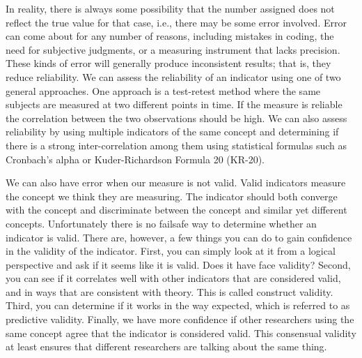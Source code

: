 \documentclass[11pt,openany]{book}\usepackage[]{graphicx}\usepackage[]{color}
\begin{document}
In reality, there is always some possibility that the number assigned does not reflect the true value for that case, i.e., there may be some error involved. Error can come about for any number of reasons, including mistakes in coding, the need for subjective judgments, or a measuring instrument that lacks precision. These kinds of error will generally produce inconsistent results; that is, they reduce reliability. We can assess the reliability of an indicator using one of two general approaches. One approach is a test-retest method where the same subjects are measured at two different points in time. If the measure is reliable the correlation between the two observations should be high. We can also assess reliability by using multiple indicators of the same concept and determining if there is a strong inter-correlation among them using statistical formulas such as Cronbach's alpha or Kuder-Richardson Formula 20 (KR-20).

We can also have error when our measure is not valid. Valid indicators measure the concept we think they are measuring. The indicator should both converge with the concept and discriminate between the concept and similar yet different concepts. Unfortunately there is no failsafe way to determine whether an indicator is valid. There are, however, a few things you can do to gain confidence in the validity of the indicator. First, you can simply look at it from a logical perspective and ask if it seems like it is valid. Does it have face validity?  Second, you can see if it correlates well with other indicators that are considered valid, and in ways that are consistent with theory. This is called construct validity. Third, you can determine if it works in the way expected, which is referred to as predictive validity. Finally, we have more confidence if 
other researchers using the same concept agree that the indicator is considered valid. This consensual validity at least ensures that different researchers are talking about the same thing.
\end{document}
